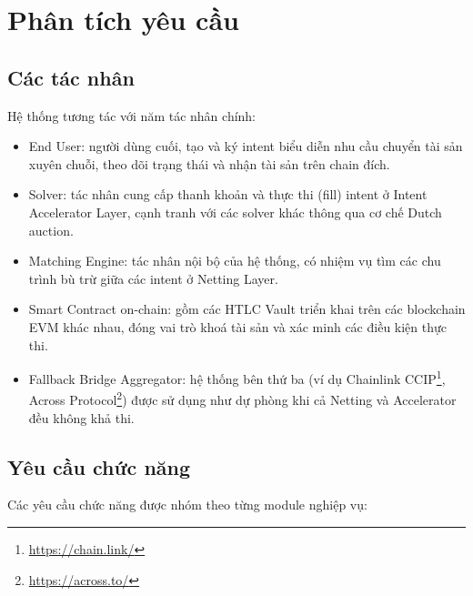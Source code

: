 \section{Phân tích yêu cầu}

\subsection{Các tác nhân}

Hệ thống tương tác với năm tác nhân chính:

\begin{itemize}
    \item End User: người dùng cuối, tạo và ký intent biểu diễn nhu cầu chuyển tài sản xuyên chuỗi, theo dõi trạng thái và nhận tài sản trên chain đích.
    \item Solver: tác nhân cung cấp thanh khoản và thực thi (fill) intent ở Intent Accelerator Layer, cạnh tranh với các solver khác thông qua cơ chế Dutch auction.
    \item Matching Engine: tác nhân nội bộ của hệ thống, có nhiệm vụ tìm các chu trình bù trừ giữa các intent ở Netting Layer.
    \item Smart Contract on-chain: gồm các HTLC Vault triển khai trên các blockchain EVM khác nhau, đóng vai trò khoá tài sản và xác minh các điều kiện thực thi.
    \item Fallback Bridge Aggregator: hệ thống bên thứ ba (ví dụ Chainlink CCIP\footnote{\url{https://chain.link/}}, Across Protocol\footnote{\url{https://across.to/}}) được sử dụng như dự phòng khi cả Netting và Accelerator đều không khả thi.
\end{itemize}

\subsection{Yêu cầu chức năng}

Các yêu cầu chức năng được nhóm theo từng module nghiệp vụ:

